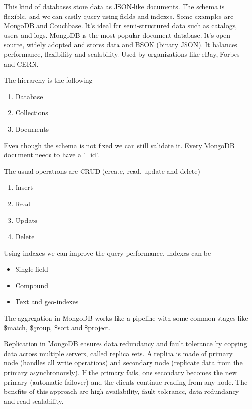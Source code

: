 This kind of databases store data as JSON-like documents. The schema is flexible, and we can easily query using fields and indexes. Some examples are MongoDB and Couchbase. It's ideal for semi-structured data such as catalogs, users and logs. MongoDB is the most popular document database. It's open-source, widely adopted and stores data and BSON (binary JSON). It balances performance, flexibility and scalability. Used by organizations like eBay, Forbes and CERN. 

\vspace{10pt}

The hierarchy is the following
\begin{enumerate}
    \item Database
    \item Collections
    \item Documents
\end{enumerate}

Even though the schema is not fixed we can still validate it. Every MongoDB document needs to have a '\_id'.

\vspace{10pt}

The usual operations are CRUD (create, read, update and delete)
\begin{enumerate}
    \item Insert
    \item Read
    \item Update
    \item Delete
\end{enumerate}

Using indexes we can improve the query performance. Indexes can be
\begin{itemize}
    \item Single-field
    \item Compound
    \item Text and geo-indexes
\end{itemize}

The aggregation in MongoDB works like a pipeline with some common stages like \$match, \$group, \$sort and \$project.

\vspace{10pt}

Replication in MongoDB ensures data redundancy and fault tolerance by copying data across multiple servers, called replica sets. A replica is made of primary node (handles all write operations) and secondary node (replicate data from the primary asynchronously). If the primary fails, one secondary becomes the new primary (automatic failover) and the clients continue reading from any node. The benefits of this approach are high availability, fault tolerance, data redundancy and read scalability. 

